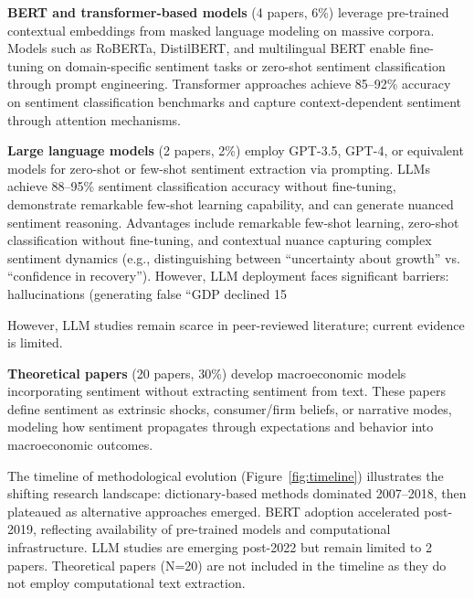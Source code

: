 \documentclass[11pt]{article}
\begin{document}
\textbf{BERT and transformer-based models} (4 papers, 6\%) leverage pre-trained contextual embeddings from masked language modeling on massive corpora. Models such as RoBERTa, DistilBERT, and multilingual BERT enable fine-tuning on domain-specific sentiment tasks or zero-shot sentiment classification through prompt engineering. Transformer approaches achieve 85--92\% accuracy on sentiment classification benchmarks and capture context-dependent sentiment through attention mechanisms.

\textbf{Large language models} (2 papers, 2\%) employ GPT-3.5, GPT-4, or equivalent models for zero-shot or few-shot sentiment extraction via prompting. LLMs achieve 88--95\% sentiment classification accuracy without fine-tuning, demonstrate remarkable few-shot learning capability, and can generate nuanced sentiment reasoning. Advantages include remarkable few-shot learning, zero-shot classification without fine-tuning, and contextual nuance capturing complex sentiment dynamics (e.g., distinguishing between ``uncertainty about growth'' vs. ``confidence in recovery''). However, LLM deployment faces significant barriers: hallucinations (generating false ``GDP declined 15%

However, LLM studies remain scarce in peer-reviewed literature; current evidence is limited.

\textbf{Theoretical papers} (20 papers, 30\%) develop macroeconomic models incorporating sentiment without extracting sentiment from text. These papers define sentiment as extrinsic shocks, consumer/firm beliefs, or narrative modes, modeling how sentiment propagates through expectations and behavior into macroeconomic outcomes.

The timeline of methodological evolution (Figure~\ref{fig:timeline}) illustrates the shifting research landscape: dictionary-based methods dominated 2007--2018, then plateaued as alternative approaches emerged. BERT adoption accelerated post-2019, reflecting availability of pre-trained models and computational infrastructure. LLM studies are emerging post-2022 but remain limited to 2 papers. Theoretical papers (N=20) are not included in the timeline as they do not employ computational text extraction.
\end{document}
